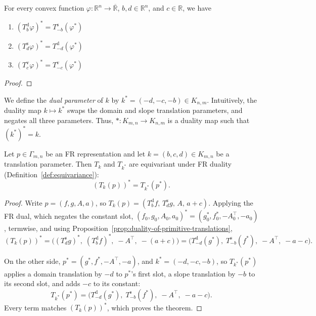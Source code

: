 \begin{proposition}
\label{prop:duality-of-primitive-translations}
For every convex function \(\varphi: \mathbb{R}^n \to \overline{\mathbb{R}}\), \(b,d \in \mathbb{R}^n\), and \(c \in \mathbb{R}\), we have
\begin{enumerate}
    \item \((T^{\mathrm d}_b \varphi)^* = T^{\mathrm s}_{-b}(\varphi^*)\)
    \item \((T^{\mathrm s}_d \varphi)^* = T^{\mathrm d}_{-d}(\varphi^*)\)
    \item \((T^{\mathrm v}_c \varphi)^* = T^{\mathrm v}_{-c}(\varphi^*)\)
\end{enumerate}
\end{proposition}
\begin{proof}
\end{proof}


We define the \emph{dual parameter} of \(k\) by
\(k^*=(-d,-c,-b)\in K_{n, m}\).
Intuitively, the duality map \(k \mapsto k^*\) swaps the domain and slope translation parameters, and negates all three parameters.
Thus, \(*: K_{m, n} \to K_{n, m}\) is a duality map such that \((k^*)^*=k\).

\begin{proposition}
\label{thm:fenchel-equivariance}
Let \(p\in \Gamma_{m, n}\) be an FR representation and let \(k=(b,c,d)\in K_{m, n}\) be a translation
parameter. Then \(T_k\) and \(T_{k^*}\) are equivariant under FR
duality (Definition~\ref{def:equivariance}):
\[
(T_k(p))^*
=
T_{k^*}(p^*).
\]
\end{proposition}

\begin{proof}
Write \(p=(f,g,A,a)\), so \(T_k(p)=(T^{\mathrm d}_bf,\,T^{\mathrm
s}_dg,\,A,\,a+c)\). Applying the FR dual, which negates the constant
slot, \((f_0,g_0,A_0,a_0)^*=(g_0^*,f_0^*,-A_0^\top,-a_0)\), termwise, and
using Proposition~\ref{prop:duality-of-primitive-translations},
\[
(T_k(p))^*
=
\big(
(T^{\mathrm s}_dg)^*,\;
(T^{\mathrm d}_bf)^*,\;
-A^\top,\;
-(a+c)
\big)
=
\big(
T^{\mathrm d}_{-d}(g^*),\;
T^{\mathrm s}_{-b}(f^*),\;
-A^\top,\;
-a-c
\big).
\]

On the other side, \(p^*=(g^*,f^*,-A^\top,-a)\), and \(k^*=(-d,-c,-b)\),
so \(T_{k^*}(p^*)\) applies a domain translation by \(-d\) to \(p^*\)'s
first slot, a slope translation by \(-b\) to its second slot, and adds
\(-c\) to its constant:
\[
T_{k^*}(p^*)
=
\big(
T^{\mathrm d}_{-d}(g^*),\;
T^{\mathrm s}_{-b}(f^*),\;
-A^\top,\;
-a-c
\big).
\]
Every term matches \((T_k(p))^*\), which proves the theorem.
\end{proof}

